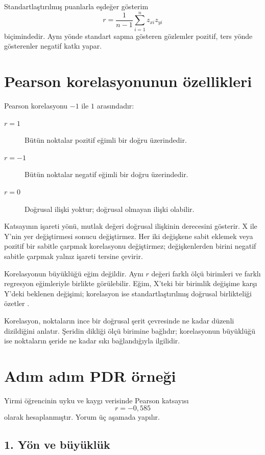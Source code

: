 Standartlaştırılmış puanlarla eşdeğer gösterim
\[
r=\frac{1}{n-1}\sum_{i=1}^n z_{xi}z_{yi}
\]
biçimindedir. Aynı yönde standart sapma gösteren gözlemler pozitif, ters yönde
gösterenler negatif katkı yapar.

\section{Pearson korelasyonunun özellikleri}

Pearson korelasyonu $-1$ ile $1$ arasındadır:

\begin{description}
  \item[$r=1$] Bütün noktalar pozitif eğimli bir doğru üzerindedir.
  \item[$r=-1$] Bütün noktalar negatif eğimli bir doğru üzerindedir.
  \item[$r=0$] Doğrusal ilişki yoktur; doğrusal olmayan ilişki olabilir.
\end{description}

Katsayının işareti yönü, mutlak değeri doğrusal ilişkinin derecesini gösterir.
X ile Y'nin yer değiştirmesi sonucu değiştirmez. Her iki değişkene sabit
eklemek veya pozitif bir sabitle çarpmak korelasyonu değiştirmez; değişkenlerden
birini negatif sabitle çarpmak yalnız işareti tersine çevirir.

Korelasyonun büyüklüğü eğim değildir. Aynı $r$ değeri farklı ölçü birimleri ve
farklı regresyon eğimleriyle birlikte görülebilir. Eğim, X'teki bir birimlik
değişime karşı Y'deki beklenen değişimi; korelasyon ise standartlaştırılmış
doğrusal birlikteliği özetler \cite{kutner2005,james2021}.

\begin{sezgibox}
Korelasyon, noktaların ince bir doğrusal şerit çevresinde ne kadar düzenli
dizildiğini anlatır. Şeridin dikliği ölçü birimine bağlıdır; korelasyonun
büyüklüğü ise noktaların şeride ne kadar sıkı bağlandığıyla ilgilidir.
\end{sezgibox}

\section{Adım adım PDR örneği}

Yirmi öğrencinin uyku ve kaygı verisinde Pearson katsayısı
\[
r=-0{,}585
\]
olarak hesaplanmıştır. Yorum üç aşamada yapılır.

\subsection*{1. Yön ve büyüklük}

